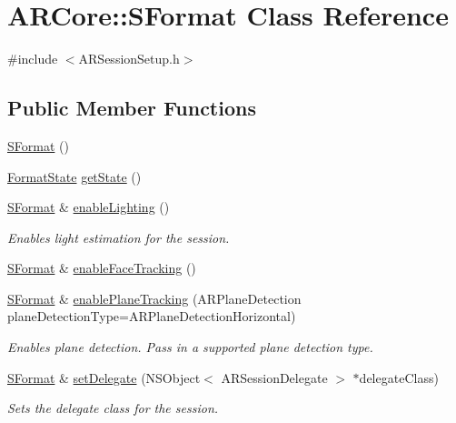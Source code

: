 \hypertarget{class_a_r_core_1_1_s_format}{}\section{A\+R\+Core\+:\+:S\+Format Class Reference}
\label{class_a_r_core_1_1_s_format}


{\ttfamily \#include $<$A\+R\+Session\+Setup.\+h$>$}

\subsection*{Public Member Functions}
\begin{DoxyCompactItemize}
\item 
\hyperlink{class_a_r_core_1_1_s_format_ae73326e3801cb8a94ef235acf1b6ea0a}{S\+Format} ()
\item 
\hyperlink{struct_a_r_core_1_1_format_state}{Format\+State} \hyperlink{class_a_r_core_1_1_s_format_a99e7aa08fc727c1f45a6a2277b5764fb}{get\+State} ()
\item 
\hyperlink{class_a_r_core_1_1_s_format}{S\+Format} \& \hyperlink{class_a_r_core_1_1_s_format_a3e4a19abf7ccdb7911148dcbc016e08d}{enable\+Lighting} ()
\begin{DoxyCompactList}\small\item\em Enables light estimation for the session. \end{DoxyCompactList}\item 
\hyperlink{class_a_r_core_1_1_s_format}{S\+Format} \& \hyperlink{class_a_r_core_1_1_s_format_ae7a325750d00b407e35531f4ea2acf1f}{enable\+Face\+Tracking} ()
\item 
\hyperlink{class_a_r_core_1_1_s_format}{S\+Format} \& \hyperlink{class_a_r_core_1_1_s_format_a3510e35fe6436e5622312f44d5bfc1df}{enable\+Plane\+Tracking} (A\+R\+Plane\+Detection plane\+Detection\+Type=A\+R\+Plane\+Detection\+Horizontal)
\begin{DoxyCompactList}\small\item\em Enables plane detection. Pass in a supported plane detection type. \end{DoxyCompactList}\item 
\hyperlink{class_a_r_core_1_1_s_format}{S\+Format} \& \hyperlink{class_a_r_core_1_1_s_format_a944fac3b51c5193dcb306bd482f4f1f1}{set\+Delegate} (N\+S\+Object$<$ A\+R\+Session\+Delegate $>$ $\ast$delegate\+Class)
\begin{DoxyCompactList}\small\item\em Sets the delegate class for the session. \end{DoxyCompactList}\end{DoxyCompactItemize}


